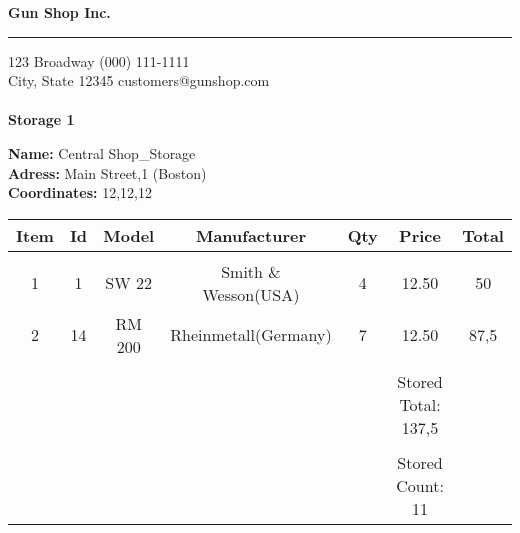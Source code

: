 \documentclass{article}
\begin{document}
\hfil{\Huge\bf Gun Shop Inc.}\hfil
\bigskip
\hrule
\bigskip

123 Broadway \hfill (000) 111-1111 \\
City, State 12345 \hfill customers@gunshop.com\\ \\

\hfill{\bf Storage 1}\hfill
\bigskip

{\bf Name:}   Central Shop\_Storage\\
{\bf Adress:}  Main Street,1 (Boston) \\
{\bf Coordinates:}  12,12,12 \\ 
\begin{center}
\begin{tabular}{ c c c c c c c }
  Item & Id & Model & Manufacturer & Qty & Price & Total  \\[2ex]
\hline\\
 1 & 1 & SW 22& Smith \& Wesson(USA)& 4 & 12.50 & 50 \\ [2ex] 2 & 14 & RM 200& Rheinmetall(Germany)& 7 & 12.50 & 87,5 \\ [2ex]\hline\\&&&&&Stored Total: 137,5&\\[2ex]\hline\\&&&&&Stored Count: 11&\\[2ex]\end{tabular}\end{center}
\end{document}
